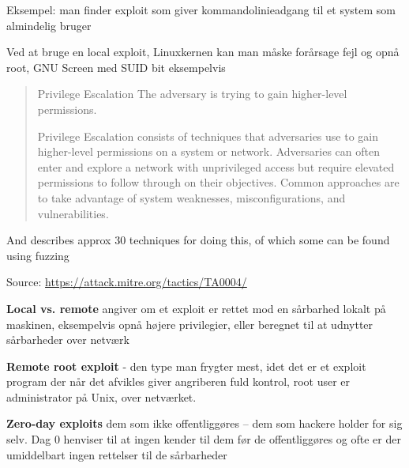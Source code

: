 \documentclass[Screen16to9,17pt]{foils}
\begin{document}
Eksempel: man finder exploit som giver kommandolinieadgang til et system
som almindelig bruger

Ved at bruge en local exploit, Linuxkernen kan man måske forårsage fejl
og opnå root, GNU Screen med SUID bit eksempelvis




\begin{quote}
Privilege Escalation
The adversary is trying to gain higher-level permissions.

Privilege Escalation consists of techniques that adversaries use to gain higher-level permissions on a system or network. Adversaries can often enter and explore a network with unprivileged access but require elevated permissions to follow through on their objectives. Common approaches are to take advantage of system weaknesses, misconfigurations, and vulnerabilities.
\end{quote}

And describes approx 30 techniques for doing this, of which  some can be found using fuzzing

Source:
\url{https://attack.mitre.org/tactics/TA0004/}



\begin{list1}
\item {\bfseries Local vs. remote}
angiver om et exploit er rettet mod
en sårbarhed lokalt på maskinen, eksempelvis
opnå højere privilegier, eller beregnet
til at udnytter sårbarheder over netværk
\item {\bfseries Remote root exploit}
- den type man frygter mest, idet
det er et exploit program der når det afvikles giver
angriberen fuld kontrol, root user er administrator
på Unix, over netværket.
\item {\bfseries Zero-day exploits} dem som ikke offentliggøres -- dem
  som hackere holder for sig selv. Dag 0 henviser til at ingen kender
  til dem før de offentliggøres og ofte er der umiddelbart ingen
  rettelser til de sårbarheder
\end{list1}



\end{document}
